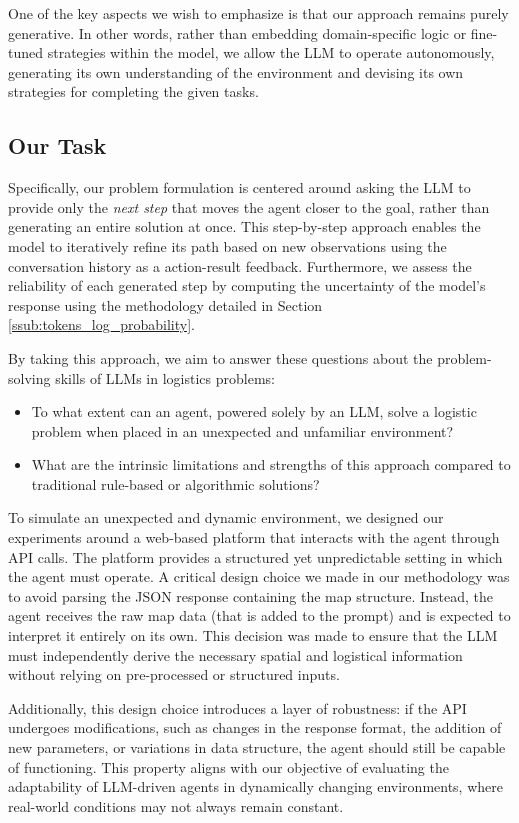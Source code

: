 One of the key aspects we wish to emphasize is that our approach remains purely
generative. In other words, rather than embedding domain-specific logic or fine-tuned
strategies within the model, we allow the LLM to operate autonomously,
generating its own understanding of the environment and devising its own
strategies for completing the given tasks.

\subsection{Our Task}
Specifically, our problem formulation is centered around asking the LLM to provide
only the \emph{next step} that moves the agent closer to the goal, rather than generating
an entire solution at once. This step-by-step approach enables the model to
iteratively refine its path based on new observations using the conversation
history as a action-result feedback. Furthermore, we assess the reliability of
each generated step by computing the uncertainty of the model's response using
the methodology detailed in Section \ref{ssub:tokens_log_probability}.

By taking this approach, we aim to answer these questions about the problem-solving
skills of LLMs in logistics problems:
\begin{itemize}
  \item To what extent can an agent, powered solely by an LLM, solve a logistic problem
    when placed in an unexpected and unfamiliar environment?

  \item What are the intrinsic limitations and strengths of this approach compared
    to traditional rule-based or algorithmic solutions?
\end{itemize}

To simulate an unexpected and dynamic environment, we designed our experiments
around a web-based platform that interacts with the agent through API calls. The
platform provides a structured yet unpredictable setting in which the agent must
operate. A critical design choice we made in our methodology was to avoid
parsing the JSON response containing the map structure. Instead, the agent
receives the raw map data (that is added to the prompt) and is expected to
interpret it entirely on its own. This decision was made to ensure that the LLM must
independently derive the necessary spatial and logistical information without relying
on pre-processed or structured inputs.

Additionally, this design choice introduces a layer of robustness: if the API undergoes
modifications, such as changes in the response format, the addition of new parameters,
or variations in data structure, the agent should still be capable of functioning.
This property aligns with our objective of evaluating the adaptability of LLM-driven
agents in dynamically changing environments, where real-world conditions may not
always remain constant.

